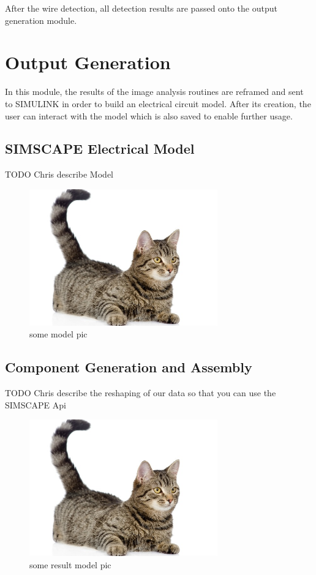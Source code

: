 \documentclass[10pt,twocolumn,letterpaper]{article}
\begin{document}
\par
After the wire detection, all detection results are passed onto the output generation module.


\section{Output Generation}
\label{sec:output}

In this module, the results of the image analysis routines are reframed and sent to SIMULINK in order to build an electrical circuit model. After its creation, the user can interact with the model which is also saved to enable further usage.

\subsection{SIMSCAPE Electrical Model}
\label{sec:sims}

TODO Chris describe Model
\par

\begin{figure}[!ht]
\includegraphics[width = 3.2in]{img/cat.jpg}
\caption{some model pic}
\label{fig:c11}
\end{figure}

\subsection{Component Generation and Assembly}
\label{sec:generation}

TODO Chris describe the reshaping of our data so that you can use the SIMSCAPE Api
\par

\begin{figure}[!ht]
\includegraphics[width = 3.2in]{img/cat.jpg}
\caption{some result model pic}
\label{fig:c12}
\end{figure}
\end{document}
